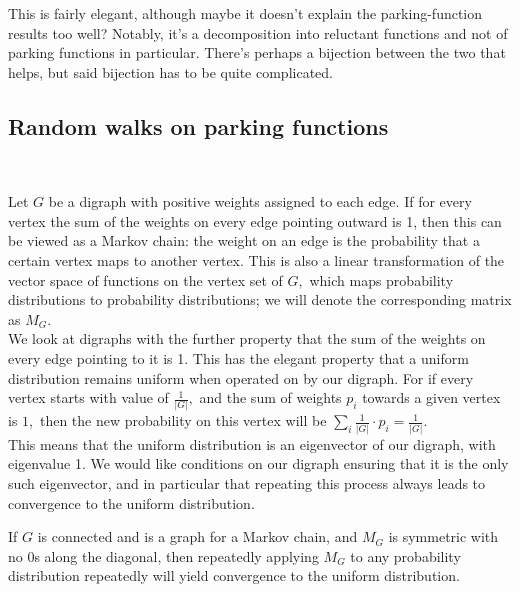 This is fairly elegant, although maybe it doesn't explain the parking-function results too well? Notably, it's a decomposition into reluctant functions and not of parking functions in particular. There's perhaps a bijection between the two that helps, but said bijection has to be quite complicated. \\

\subsection*{Random walks on parking functions}~

Let $G$ be a digraph with positive weights assigned to each edge. If for every vertex the sum of the weights on every edge pointing outward is 1, then this can be viewed as a Markov chain: the weight on an edge is the probability that a certain vertex maps to another vertex. This is also a linear transformation of the vector space of functions on the vertex set of $G,$ which maps probability distributions to probability distributions; we will denote the corresponding matrix as $M_G$.\\

We look at digraphs with the further property that the sum of the weights on every edge pointing to it is 1. This has the elegant property that a uniform distribution remains uniform when operated on by our digraph. For if every vertex starts with value of $\frac{1}{|G|},$ and the sum of weights $p_i$ towards a given vertex is $1,$ then the new probability on this vertex will be $\sum_i \frac{1}{|G|}\cdot p_i=\frac{1}{|G|}.$\\

This means that the uniform distribution is an eigenvector of our digraph, with eigenvalue 1. We would like conditions on our digraph ensuring that it is the only such eigenvector, and in particular that repeating this process always leads to convergence to the uniform distribution.

\begin{proposition}
    If $G$ is connected and is a graph for a Markov chain, and $M_G$ is symmetric with no 0s along the diagonal, then repeatedly applying $M_G$ to any probability distribution repeatedly will yield convergence to the uniform distribution.
\end{proposition}

